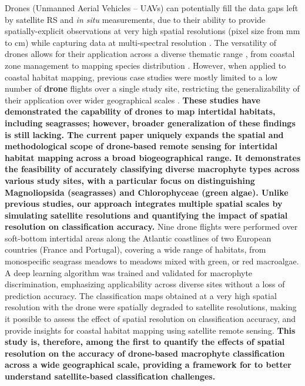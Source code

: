\documentclass[
  number]{elsarticle}
\begin{document}
Drones (Unmanned Aerial Vehicles -- UAVs) can potentially fill the data
gaps left by satellite RS and \emph{in situ} measurements, due to their
ability to provide spatially-explicit observations at very high spatial
resolutions (pixel size from mm to cm) while capturing data at
multi-spectral resolution \citep{fairley2022drone, oh2017use}. The
versatility of drones allows for their application across a diverse
thematic range , from coastal zone management
\citep{adade2021, casella2020, angnuureng2022} to mapping species
distribution
\citep{joyce2023, tallam2023, Roca2022, Roman2021, Brunier2022Topographic, sousa2019blue}.
However, when applied to coastal habitat mapping, previous case studies
were mostly limited to a low number of \textbf{drone} flights over a
single study site, restricting the generalizability of their application
over wider geographical scales
\citep{Roman2021, collin2019improving, rossiter2020uav, Brunier2022Topographic}.
\textbf{These studies have demonstrated the capability of drones to map
intertidal habitats, including seagrasses; however, broader
generalization of these findings is still lacking. The current paper
uniquely expands the spatial and methodological scope of drone-based
remote sensing for intertidal habitat mapping across a broad
biogeographical range. It demonstrates the feasibility of accurately
classifying diverse macrophyte types across various study sites, with a
particular focus on distinguishing Magnoliopsida (seagrasses) and
Chlorophyceae (green algae). Unlike previous studies, our approach
integrates multiple spatial scales by simulating satellite resolutions
and quantifying the impact of spatial resolution on classification
accuracy.} Nine drone flights were performed over soft-bottom intertidal
areas along the Atlantic coastlines of two European countries (France
and Portugal), covering a wide range of habitats, from monospecific
seagrass meadows to meadows mixed with green, or red macroalgae. A deep
learning algorithm was trained and validated for macrophyte
discrimination, emphasizing applicability across diverse sites without a
loss of prediction accuracy. The classification maps obtained at a very
high spatial resolution with the drone were spatially degraded to
satellite resolutions, making it possible to assess the effect of
spatial resolution on classification accuracy, and provide insights for
coastal habitat mapping using satellite remote sensing. \textbf{This
study is, therefore, among the first to quantify the effects of spatial
resolution on the accuracy of drone-based macrophyte classification
across a wide geographical scale, providing a framework for to better
understand satellite-based classification challenges.}
\end{document}
